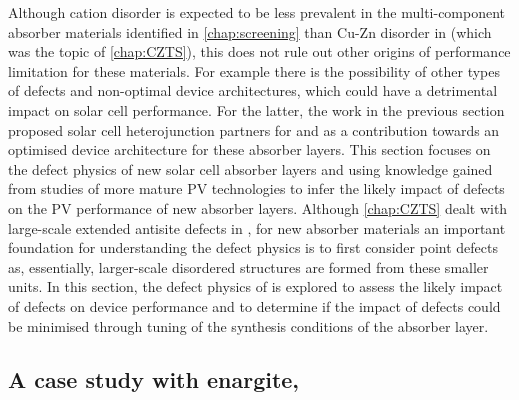 \documentclass[11pt, twoside]{report}
\begin{document}
Although cation disorder is expected to be less prevalent in the multi-component absorber materials identified in \autoref{chap:screening} than Cu-Zn disorder in {\CZTS} (which was the topic of \autoref{chap:CZTS}), this does not rule out other origins of performance limitation for these materials. For example there is the possibility of other types of defects and non-optimal device architectures, which could have a detrimental impact on solar cell performance. For the latter, the work in the previous section proposed solar cell heterojunction partners for {\enargite} and {\bournonite} as a contribution towards an optimised device architecture for these absorber layers. This section focuses on the defect physics of new solar cell absorber layers and using knowledge gained from studies of more mature PV technologies to infer the likely impact of defects on the PV performance of new absorber layers. Although \autoref{chap:CZTS} dealt with large-scale extended antisite defects in {\CZTS}, for new absorber materials an important foundation for understanding the defect physics is to first consider point defects as, essentially, larger-scale disordered structures are formed from these smaller units. In this section, the defect physics of {\enargite} is explored to assess the likely impact of defects on device performance and to determine if the impact of defects could be minimised through tuning of the synthesis conditions of the absorber layer.


\subsection{A case study with enargite, {\enargite}}
\end{document}
